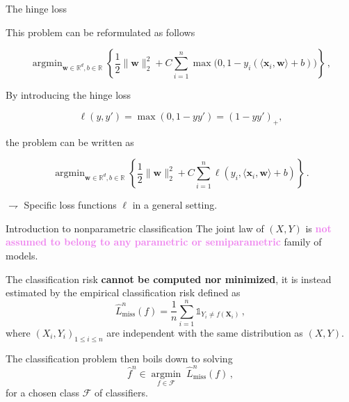 \documentclass[9pt]{beamer}
\DeclareMathOperator*{\argmin}{argmin}%
\newcommand{\R}{\mathbb{R}}
\newcommand{\vecX}{\textbf{X}}
\newcommand{\bw}{\textbf{w}}
\newcommand{\eqsp}{\,}
\newcommand{\bx}{\textbf{x}}
\newcommand{\inr}[1]{\langle #1 \rangle}
\newcommand{\norm}[1]{\|#1\|}
\begin{document}
\begin{frame}{The hinge loss}

This problem can be reformulated as follows

\begin{equation*}
\argmin_{\bw \in \R^d, b \in \R} \left\{\frac 12 \norm{\bw}_2^2 + C \sum_{i=1}^n \max\Big(0, 1 - y_i (\inr{\bx_i, \bw} + b) \Big)\right\}\eqsp,
\end{equation*}

\vspace{0.2cm}

By introducing the \alert{hinge loss}

\begin{equation*}
\ell(y, y') = \max(0, 1 - y y') = (1 - y y')_+,
\end{equation*}

\vspace{0.2cm}
the problem can be written as

\begin{equation*}
\argmin_{\bw \in \R^d, b \in \R} \left\{\frac 12 \norm{\bw}_2^2 + C \sum_{i=1}^n \ell(y_i, \inr{\bx_i, \bw} + b)\right \}\eqsp.
\end{equation*}

\vspace{0.2cm}

$\rightharpoondown$ Specific  loss functions $\ell$ in a \alert{general setting}.

\end{frame}

\begin{frame}{Introduction to nonparametric classification}
The joint law of $(X,Y)$ is \textcolor{violet}{{\bf not assumed to belong to any parametric or semiparametric}} family of models. 


\vspace{.4cm}

The classification risk {\bf cannot be computed nor  minimized}, it is instead estimated by the empirical classification risk defined as
\[
\widehat L^n_{\mathrm{miss}}(f) = \frac{1}{n}\sum_{i=1}^n \mathds{1}_{Y_i \neq f(\vecX_i)}\,,
\]
where  $(X_i,Y_i)_{1\leqslant i\leqslant n}$ are independent  with the same distribution as $(X,Y)$. 

\vspace{.4cm}

The classification problem then boils down to solving
\[
\widehat f^n \in \underset{f\in\mathcal{F}}{\argmin}\;\widehat L^n_{\mathrm{miss}}(f)\eqsp,
\]
for a chosen class $\mathcal{F}$ of classifiers.
\end{frame}
\end{document}
